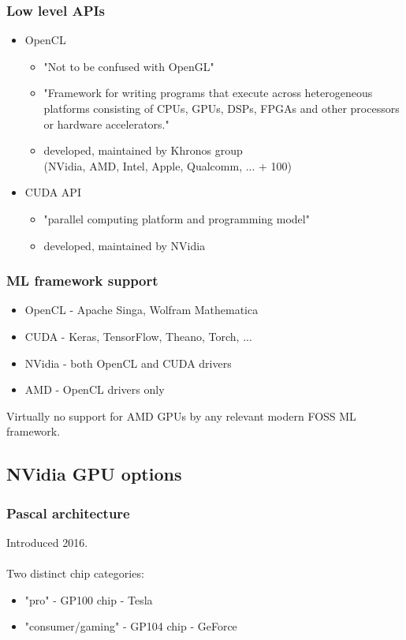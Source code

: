 \documentclass{beamer}
\begin{document}
			\begin{frame}
				\frametitle{Low level APIs}
				\begin{itemize} 
					\item OpenCL
						\begin{itemize} 
							\item "Not to be confused with OpenGL"
							\item "Framework for writing programs that execute across heterogeneous platforms consisting of CPUs, GPUs, DSPs, FPGAs and other processors or hardware accelerators."
							\item developed, maintained by Khronos group\\
								(NVidia, AMD, Intel, Apple, Qualcomm, ... + 100)
						\end{itemize} 
					\item CUDA API 
						\begin{itemize} 
							\item "parallel computing platform and programming model"
							\item developed, maintained by NVidia
						\end{itemize} 
				\end{itemize} 
			\end{frame}
			
			\begin{frame}
				\frametitle{ML framework support}
				\begin{itemize} 
					\item OpenCL - Apache Singa, Wolfram Mathematica
					\item CUDA - Keras, TensorFlow, Theano, Torch, ...
				\end{itemize} 
				\begin{itemize} 
					\item NVidia - both OpenCL and CUDA drivers\\
					\item AMD - OpenCL drivers only
				\end{itemize} 
				
				Virtually no support for AMD GPUs by any relevant modern FOSS ML framework.
			\end{frame}
			
		\subsection{NVidia GPU options}
			\begin{frame}
				\frametitle{Pascal architecture}
				Introduced 2016.\\~\\
				
				Two distinct chip categories:
				\begin{itemize} 
					\item "pro" - GP100 chip - Tesla
					\item "consumer/gaming" - GP104 chip - GeForce
				\end{itemize} 
			\end{frame}
			
\end{document}
